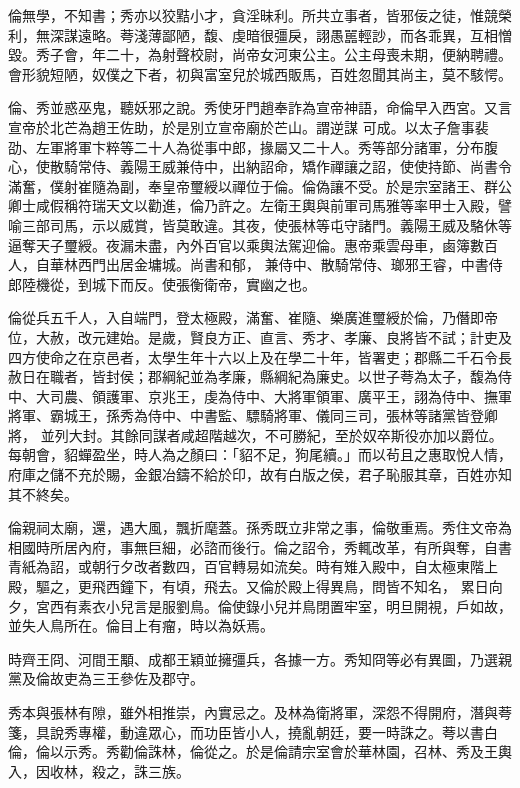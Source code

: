 \begin{pinyinscope}
 倫無學，不知書；秀亦以狡黠小才，貪淫昧利。所共立事者，皆邪佞之徒，惟競榮利，無深謀遠略。荂淺薄鄙陋，馥、虔暗很彊戾，詡愚嚚輕訬，而各乖異，互相憎毀。秀子會，年二十，為射聲校尉，尚帝女河東公主。公主母喪未期，便納聘禮。會形貌短陋，奴僕之下者，初與富室兒於城西販馬，百姓忽聞其尚主，莫不駭愕。



 倫、秀並惑巫鬼，聽妖邪之說。秀使牙門趙奉詐為宣帝神語，命倫早入西宮。又言宣帝於北芒為趙王佐助，於是別立宣帝廟於芒山。謂逆謀
 可成。以太子詹事裴劭、左軍將軍卞粹等二十人為從事中郎，掾屬又二十人。秀等部分諸軍，分布腹心，使散騎常侍、義陽王威兼侍中，出納詔命，矯作禪讓之詔，使使持節、尚書令滿奮，僕射崔隨為副，奉皇帝璽綬以禪位于倫。倫偽讓不受。於是宗室諸王、群公卿士咸假稱符瑞天文以勸進，倫乃許之。左衛王輿與前軍司馬雅等率甲士入殿，譬喻三部司馬，示以威賞，皆莫敢違。其夜，使張林等屯守諸門。義陽王威及駱休等逼奪天子璽綬。夜漏未盡，內外百官以乘輿法駕迎倫。惠帝乘雲母車，鹵簿數百人，自華林西門出居金墉城。尚書和郁，
 兼侍中、散騎常侍、瑯邪王睿，中書侍郎陸機從，到城下而反。使張衡衛帝，實幽之也。



 倫從兵五千人，入自端門，登太極殿，滿奮、崔隨、樂廣進璽綬於倫，乃僭即帝位，大赦，改元建始。是歲，賢良方正、直言、秀才、孝廉、良將皆不試；計吏及四方使命之在京邑者，太學生年十六以上及在學二十年，皆署吏；郡縣二千石令長赦日在職者，皆封侯；郡綱紀並為孝廉，縣綱紀為廉史。以世子荂為太子，馥為侍中、大司農、領護軍、京兆王，虔為侍中、大將軍領軍、廣平王，詡為侍中、撫軍將軍、霸城王，孫秀為侍中、中書監、驃騎將軍、儀同三司，張林等諸黨皆登卿將，
 並列大封。其餘同謀者咸超階越次，不可勝紀，至於奴卒斯役亦加以爵位。每朝會，貂蟬盈坐，時人為之顏曰：「貂不足，狗尾續。」而以茍且之惠取悅人情，府庫之儲不充於賜，金銀冶鑄不給於印，故有白版之侯，君子恥服其章，百姓亦知其不終矣。



 倫親祠太廟，還，遇大風，飄折麾蓋。孫秀既立非常之事，倫敬重焉。秀住文帝為相國時所居內府，事無巨細，必諮而後行。倫之詔令，秀輒改革，有所與奪，自書青紙為詔，或朝行夕改者數四，百官轉易如流矣。時有雉入殿中，自太極東階上殿，驅之，更飛西鐘下，有頃，飛去。又倫於殿上得異鳥，問皆不知名，
 累日向夕，宮西有素衣小兒言是服劉鳥。倫使錄小兒并鳥閉置牢室，明旦開視，戶如故，並失人鳥所在。倫目上有瘤，時以為妖焉。



 時齊王冏、河間王顒、成都王穎並擁彊兵，各據一方。秀知冏等必有異圖，乃選親黨及倫故吏為三王參佐及郡守。



 秀本與張林有隙，雖外相推崇，內實忌之。及林為衛將軍，深怨不得開府，潛與荂箋，具說秀專權，動違眾心，而功臣皆小人，撓亂朝廷，要一時誅之。荂以書白倫，倫以示秀。秀勸倫誅林，倫從之。於是倫請宗室會於華林園，召林、秀及王輿入，因收林，殺之，誅三族。




\end{pinyinscope}

